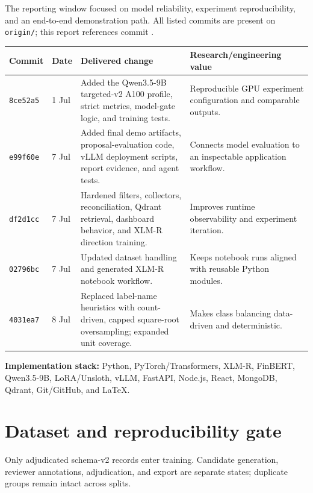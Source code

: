 \documentclass[10pt,a4paper]{article}
\begin{document}
The reporting window focused on model reliability, experiment reproducibility, and an end-to-end
demonstration path. All listed commits are present on \texttt{origin/\BranchName}; this report
references commit \texttt{\HeadCommit}.

\begin{table}[H]
\centering
\small
\begin{tabularx}{\textwidth}{@{}L{0.12\textwidth}L{0.13\textwidth}Y L{0.22\textwidth}@{}}
\toprule
\textbf{Commit} & \textbf{Date} & \textbf{Delivered change} & \textbf{Research/engineering value} \\
\midrule
\texttt{8ce52a5} & 1 Jul & Added the Qwen3.5-9B targeted-v2 A100 profile, strict metrics, model-gate logic, and training tests. & Reproducible GPU experiment configuration and comparable outputs. \\
\texttt{e99f60e} & 7 Jul & Added final demo artifacts, proposal-evaluation code, vLLM deployment scripts, report evidence, and agent tests. & Connects model evaluation to an inspectable application workflow. \\
\texttt{df2d1cc} & 7 Jul & Hardened filters, collectors, reconciliation, Qdrant retrieval, dashboard behavior, and XLM-R direction training. & Improves runtime observability and experiment iteration. \\
\texttt{02796bc} & 7 Jul & Updated dataset handling and generated XLM-R notebook workflow. & Keeps notebook runs aligned with reusable Python modules. \\
\texttt{4031ea7} & 8 Jul & Replaced label-name heuristics with count-driven, capped square-root oversampling; expanded unit coverage. & Makes class balancing data-driven and deterministic. \\
\bottomrule
\end{tabularx}
\end{table}

\textbf{Implementation stack:} Python, PyTorch/Transformers, XLM-R, FinBERT, Qwen3.5-9B,
LoRA/Unsloth, vLLM, FastAPI, Node.js, React, MongoDB, Qdrant, Git/GitHub, and LaTeX.

\clearpage
\section{Dataset and reproducibility gate}

Only adjudicated schema-v2 records enter training. Candidate generation, reviewer annotations,
adjudication, and export are separate states; duplicate groups remain intact across splits.
\end{document}
